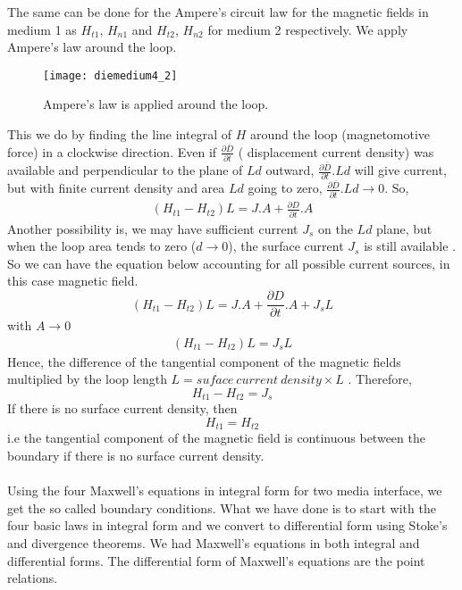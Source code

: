 	  The same can be done for the Ampere's circuit law for the magnetic fields in medium 1 as $H_{t1}$, $H_{n1}$ and $H_{t2}$, $H_{n2}$ for medium 2 respectively. We apply Ampere's law around the loop.
	  \begin{figure}[h]
	  	\centering
	  	\texttt{[image: diemedium4\_2]}
	  	\caption{Ampere's law is applied around the loop.}
	  \end{figure}
  	  This we do by finding the line integral of $H$ around the loop (magnetomotive force) in a clockwise direction. Even if $\frac{\partial\overline{D}}{\partial t}$ ( displacement current density) was available and perpendicular to the plane of $Ld$ outward, $\frac{\partial\overline{D}}{\partial t}. Ld$ will give current, but with finite current density and area $Ld$ going to zero,  $\frac{\partial\overline{D}}{\partial t}. Ld \rightarrow 0 $. So,
  	  \begin{align*}
  	  (H_{t1} - H_{t2})L = J.A +\frac{\partial D}{\partial t}.A
  	  \end{align*}
  	  Another possibility is, we may have sufficient current $J_s$ on the $Ld$ plane, but when the loop area tends to zero ($d \rightarrow 0 $), the surface current $J_s$ is still available . So we can have the equation below accounting for all possible current sources, in this case magnetic field.
  	  \begin{equation}
  	  (H_{t1} - H_{t2})L = J.A +\frac{\partial D}{\partial t}.A + J_sL
  	  \end{equation}
  	  with $A \rightarrow 0$
  	  \begin{align*}
  	  (H_{t1} - H_{t2})L = J_sL
  	  \end{align*}
	  Hence, the difference of the tangential component of the magnetic fields multiplied by the loop length $L = suface\ current\ density \times L$ . Therefore,
	  \begin{equation}
	  H_{t1} - H_{t2} = J_s
	  \end{equation}
	  If there is no surface current density, then 
	  \begin{equation}
	  H_{t1} = H_{t2}
	  \end{equation}
	  i.e the tangential component of the magnetic field is continuous between the boundary if there is no surface current density.\\ \\ 
	  Using the four Maxwell's equations in integral form for two media interface, we get the so called boundary conditions. What we have done is to start with the four basic laws in integral form and we convert to differential form using Stoke's and divergence theorems. We had Maxwell's equations in both integral and differential forms. The differential form of Maxwell's equations are the point relations.\\ \\

